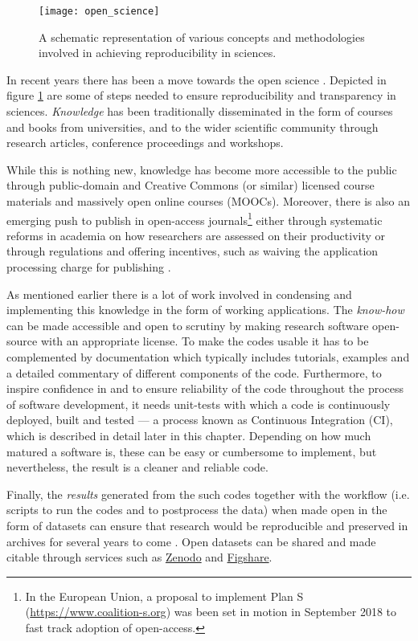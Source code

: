 \begin{figure}[h]
  \centering
  \texttt{[image: open\_science]}
  \caption{A schematic representation of various concepts and methodologies
  involved in achieving reproducibility in sciences.}\label{fig:opensci}
\end{figure}

In recent years there has been a move towards the open science
\citep[see the report by][]{royal_society_great_britain_science_2012}.
%
Depicted in figure \ref{fig:opensci} are some of steps needed to ensure
reproducibility and transparency in sciences.
%
\emph{Knowledge} has been traditionally disseminated in the form of courses and
books from universities, and to the wider scientific community through research
articles, conference proceedings and workshops.

While this is nothing new, knowledge has become more accessible to the public
through public-domain and Creative Commons (or similar) licensed course
materials and massively open online courses (MOOCs). Moreover, there is also an
emerging push to publish in open-access journals\footnote{In the European
  Union, a proposal to implement Plan S (\url{https://www.coalition-s.org}) was
  been set in motion in September 2018 to fast track adoption of open-access.
} either through systematic
reforms in academia on how researchers are assessed on their productivity or
through regulations and offering incentives, such as waiving the application
processing charge for publishing \citep{nosek_promoting_2015}.

As mentioned earlier there is a lot of work involved in condensing and
implementing this knowledge in the form of working applications.
%
The \emph{know-how} can be made accessible and open to scrutiny by making
research software open-source with an appropriate license.  To make the codes
usable it has to be complemented by documentation which typically includes
tutorials, examples and a detailed commentary of different components of the code.
%
Furthermore, to inspire confidence in and to ensure reliability of the code
throughout the process of software development, it needs unit-tests with
which a code is continuously deployed, built and tested --- a process known as
Continuous Integration (CI), which is described in detail later in this
chapter. Depending on how much matured a software is, these can be easy or
cumbersome to implement, but nevertheless, the result is a cleaner and reliable
code.

Finally, the \emph{results} generated from the such codes together with the
workflow (i.e. scripts to run the codes and to postprocess the data) when made
open in the form of datasets can ensure that research would be reproducible and
preserved in archives for several years to come \citep{gewin_data_2016}. Open
datasets can be shared and made citable through services such as
\href{https://zenodo.org}{Zenodo} and \href{https://figshare.com}{Figshare}.

